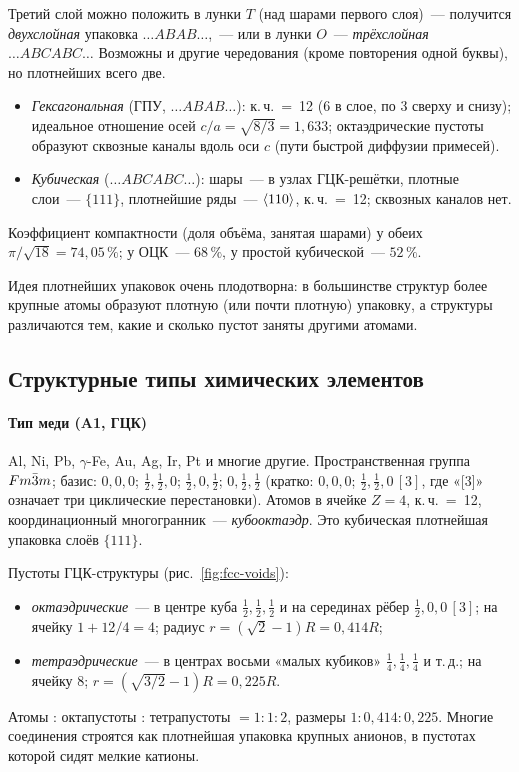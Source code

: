 Третий слой можно положить в лунки $T$ (над шарами первого слоя)~—
получится \emph{двухслойная} упаковка $\ldots ABAB\ldots$,~— или в лунки $O$~—
\emph{трёхслойная} $\ldots ABCABC\ldots$ Возможны и другие чередования (кроме
повторения одной буквы), но плотнейших всего две.

\begin{glavnoe}
\begin{itemize}
\item \emph{Гексагональная} (ГПУ, $\ldots ABAB\ldots$): к.\,ч.~=~12 (6 в слое, по 3
сверху и снизу); идеальное отношение осей
$c/a=\sqrt{8/3}=1{,}633$; октаэдрические пустоты образуют сквозные каналы
вдоль оси $c$ (пути быстрой диффузии примесей).
\item \emph{Кубическая} ($\ldots ABCABC\ldots$): шары~— в узлах ГЦК-решётки,
плотные слои~— $\{111\}$, плотнейшие ряды~— $\langle 110\rangle$, к.\,ч.~=~12;
сквозных каналов нет.
\end{itemize}
Коэффициент компактности (доля объёма, занятая шарами) у обеих
$\pi/\sqrt{18}=74{,}05\,\%$; у ОЦК~— $68\,\%$, у простой кубической~— $52\,\%$.
\end{glavnoe}

Идея плотнейших упаковок очень плодотворна: в большинстве структур более
крупные атомы образуют плотную (или почти плотную) упаковку, а структуры
различаются тем, какие и сколько пустот заняты другими атомами.

\subsection{Структурные типы химических элементов}\label{ssec:elem-types}

\paragraph{Тип меди (A1, ГЦК)}
Al, Ni, Pb, $\gamma$-Fe, Au, Ag, Ir, Pt и многие другие. Пространственная
группа $Fm\bar{3}m$; базис: $0,0,0$; $\frac12,\frac12,0$; $\frac12,0,\frac12$;
$0,\frac12,\frac12$ (кратко: $0,0,0$; $\frac12,\frac12,0\,[3]$, где
«[3]» означает три циклические перестановки). Атомов в ячейке $Z=4$, к.\,ч.~=~12,
координационный многогранник~— \emph{кубооктаэдр}. Это кубическая
плотнейшая упаковка слоёв $\{111\}$.

Пустоты ГЦК-структуры (рис.~\ref{fig:fcc-voids}):
\begin{itemize}
\item \emph{октаэдрические}~— в центре куба $\frac12,\frac12,\frac12$ и на серединах
рёбер $\frac12,0,0\,[3]$; на ячейку $1+12/4=4$; радиус
$r=(\sqrt2-1)R=0{,}414R$;
\item \emph{тетраэдрические}~— в центрах восьми «малых кубиков»
$\frac14,\frac14,\frac14$ и т.\,д.; на ячейку 8; $r=(\sqrt{3/2}-1)R=0{,}225R$.
\end{itemize}
Атомы : октапустоты : тетрапустоты $=1:1:2$, размеры
$1:0{,}414:0{,}225$. Многие соединения строятся как плотнейшая упаковка
крупных анионов, в пустотах которой сидят мелкие катионы.

